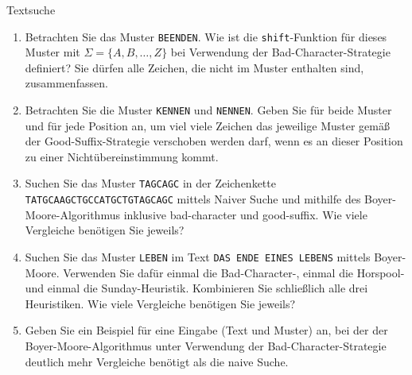 \documentclass[11pt,a4paper]{article}
\begin{document}
\begin{aufgabe}{3}{Textsuche}
    \begin{enumerate}[label=\alph*)]
        \item Betrachten Sie das Muster \texttt{BEENDEN}.
        Wie ist die \texttt{shift}-Funktion für dieses Muster mit $\Sigma = \{A, B, \ldots, Z\}$ bei Verwendung der Bad-Character-Strategie definiert?
        Sie dürfen alle Zeichen, die nicht im Muster enthalten sind, zusammenfassen.
        \item Betrachten Sie die Muster \texttt{KENNEN} und \texttt{NENNEN}.
        Geben Sie für beide Muster und für jede Position an, um viel viele Zeichen das jeweilige Muster gemäß der Good-Suffix-Strategie verschoben werden darf, wenn es an dieser Position zu einer Nichtübereinstimmung kommt.
        \item Suchen Sie das Muster \texttt{TAGCAGC} in der Zeichenkette \texttt{TATGCAAGCTGCCATGCTGTAGCAGC} mittels Naiver Suche und mithilfe des Boyer-Moore-Algorithmus inklusive bad-character und good-suffix.
        Wie viele Vergleiche benötigen Sie jeweils?
        \item 
        Suchen Sie das Muster \texttt{LEBEN} im Text \texttt{DAS ENDE EINES LEBENS} mittels Boyer-Moore.
        Verwenden Sie dafür einmal die Bad-Character-, einmal die Horspool- und einmal die Sunday-Heuristik.
        Kombinieren Sie schließlich alle drei Heuristiken.
        Wie viele Vergleiche benötigen Sie jeweils?
        \item Geben Sie ein Beispiel für eine Eingabe (Text und Muster) an, bei der der Boyer-Moore-Algorithmus unter Verwendung der Bad-Character-Strategie deutlich mehr Vergleiche benötigt als die naive Suche.

\end{enumerate}
\end{aufgabe}
\end{document}
